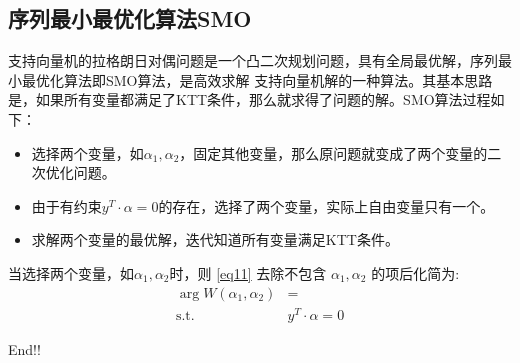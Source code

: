 \documentclass[12pt, a4paper, oneside]{ctexart}
\begin{document}
\subsection{序列最小最优化算法SMO}
支持向量机的拉格朗日对偶问题是一个凸二次规划问题，具有全局最优解，序列最小最优化算法即SMO算法，是高效求解
支持向量机解的一种算法。其基本思路是，如果所有变量都满足了KTT条件，那么就求得了问题的解。SMO算法过程如下：
\begin{itemize}
    \item 选择两个变量，如$\alpha_1,\alpha_2$，固定其他变量，那么原问题就变成了两个变量的二次优化问题。
    \item 由于有约束$y^T \cdot \alpha = 0$的存在，选择了两个变量，实际上自由变量只有一个。
    \item 求解两个变量的最优解，迭代知道所有变量满足KTT条件。
\end{itemize}
当选择两个变量，如$\alpha_1,\alpha_2$时，则 \eqref{eq11} 去除不包含 $\alpha_1,\alpha_2$ 的项后化简为:
\begin{align}
    \mathop{\arg\min_{\alpha_1, \alpha_2}}  W(\alpha_1, \alpha_2) &=  \label{eq12} \\
    \mathrm{ s.t. }\ \   &y^T \cdot \alpha = 0 \nonumber 
\end{align}

End!!
\end{document}
